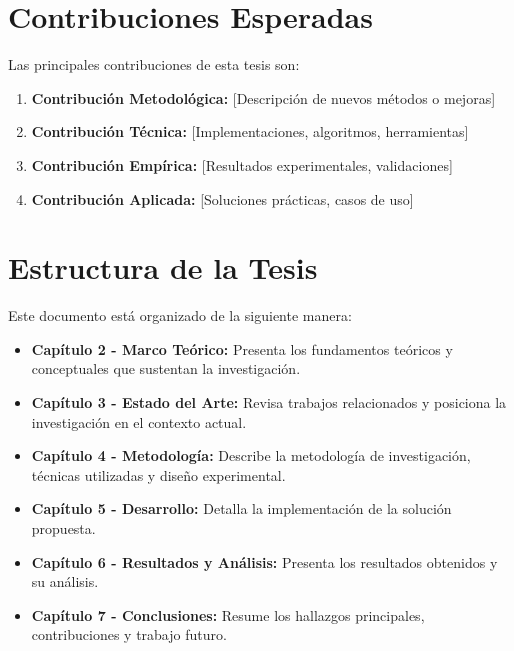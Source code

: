 \section{Contribuciones Esperadas}

Las principales contribuciones de esta tesis son:

\begin{enumerate}
    \item \textbf{Contribución Metodológica:} [Descripción de nuevos métodos o mejoras]
    \item \textbf{Contribución Técnica:} [Implementaciones, algoritmos, herramientas]
    \item \textbf{Contribución Empírica:} [Resultados experimentales, validaciones]
    \item \textbf{Contribución Aplicada:} [Soluciones prácticas, casos de uso]
\end{enumerate}

\section{Estructura de la Tesis}

Este documento está organizado de la siguiente manera:

\begin{itemize}
    \item \textbf{Capítulo 2 - Marco Teórico:} Presenta los fundamentos teóricos y conceptuales que sustentan la investigación.
    
    \item \textbf{Capítulo 3 - Estado del Arte:} Revisa trabajos relacionados y posiciona la investigación en el contexto actual.
    
    \item \textbf{Capítulo 4 - Metodología:} Describe la metodología de investigación, técnicas utilizadas y diseño experimental.
    
    \item \textbf{Capítulo 5 - Desarrollo:} Detalla la implementación de la solución propuesta.
    
    \item \textbf{Capítulo 6 - Resultados y Análisis:} Presenta los resultados obtenidos y su análisis.
    
    \item \textbf{Capítulo 7 - Conclusiones:} Resume los hallazgos principales, contribuciones y trabajo futuro.
\end{itemize}
